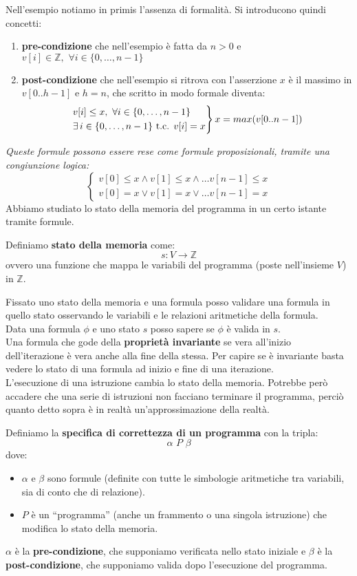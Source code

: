 Nell'esempio notiamo in primis l'assenza di formalità. Si introducono quindi
concetti:
\begin{enumerate}
	\item \textbf{pre-condizione} che nell'esempio è fatta da $n>0$ e
	      $v[i]\in\mathbb{Z},\,\,\forall i\in \{0,\ldots, n-1\}$
	\item \textbf{post-condizione} che nell'esempio si ritrova con l'asserzione $x$
	      è il massimo in $v[0..h-1]$ e $h=n$, che scritto in modo formale diventa:
	      \[
	      	\begin{rcases}
	      		v[i]\leq x,\,\,\forall i\in \{0,\ldots, n-1\}\\
	      		\exists\,i\in\{0,\ldots, n-1\}\mbox{ t.c. } v[i]=x
	      	\end{rcases}
	      	x=max(v[0..n-1])
	      \]
\end{enumerate}
\textit{Queste formule possono essere rese come formule proposizionali, tramite
una congiunzione logica:}
\[
	\begin{cases}
		v[0]\leq x \land v[1]\leq x\land\ldots v[n-1]\leq x \\
		v[0]= x \lor v[1]= x\lor\ldots v[n-1]=x             
	\end{cases}
\]
Abbiamo studiato lo stato della memoria del programma in un certo istante
tramite formule.
\begin{definizione}
	Definiamo \textbf{stato della memoria} come:
	\[s:V\to\mathbb{Z}\]
	ovvero una funzione che mappa le variabili del programma (poste nell'insieme
	$V$) in $\mathbb{Z}$.
\end{definizione}
Fissato uno stato della memoria e una formula posso validare una formula in
quello stato osservando le variabili e le relazioni aritmetiche della
formula.\\
Data una formula $\phi$ e uno stato $s$ posso sapere se $\phi$ è valida in
$s$.\\
Una formula che gode della \textbf{proprietà invariante} se vera all'inizio
dell'iterazione è vera anche alla fine della stessa. Per capire se è invariante
basta vedere lo stato di una formula ad inizio e fine di una iterazione.\\
L'esecuzione di una istruzione cambia lo stato della memoria. Potrebbe però
accadere che una serie di istruzioni non facciano terminare il programma, perciò
quanto detto sopra è in realtà un'approssimazione della realtà.
\begin{definizione}
	Definiamo la \textbf{specifica di correttezza di un programma} con la tripla:
	\[\alpha\,\, P\,\, \beta\]
	dove:
	\begin{itemize}
		\item $\alpha$ e $\beta$ sono formule (definite con tutte le simbologie
		      aritmetiche tra variabili, sia di conto che di relazione).
		\item $P$ è un ``programma'' (anche un frammento o una singola istruzione) che
		      modifica lo stato della memoria.
	\end{itemize}
	$\alpha$ è la \textbf{pre-condizione}, che supponiamo verificata nello stato
	iniziale e $\beta$ è la \textbf{post-condizione}, 
	che supponiamo valida dopo l'esecuzione del programma.
\end{definizione}
